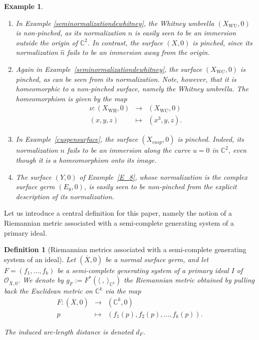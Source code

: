 \documentclass[reqno,dvipsnames,12pt]{amsart}
\newtheorem{defi}[thm]{Definition}
\newtheorem{exam}[thm]{Example}
\begin{document}
\begin{exam}


\begin{enumerate}
    \item In Example \ref{seminormalizationdewhitney}, the Whitney umbrella $(X_{\mathrm{WU}},0)$ is non-pinched, as its normalization $n$ is easily seen to be an immersion outside the origin of $\mathbb{C}^2$. In contrast, the surface $(X,0)$ is pinched, since its normalization $\hat{n}$ fails to be an immersion away from the origin. 
 \item Again in Example~\ref{seminormalizationdewhitney}, the surface $(X_{\mathrm{WC}},0)$ is pinched, as can be seen from its normalization.  Note, however, that it is homeomorphic to a non-pinched surface, namely the Whitney umbrella. The homeomorphism is given by the map
\[
\begin{array}{ccc}
\nu : (X_{\mathrm{WH}},0) & \longrightarrow & (X_{\mathrm{WC}},0) \\
(x,y,z) & \longmapsto & (x^3,y,z).
\end{array}
\]
    
  \item In Example~\ref{cuspensurface}, the surface $(X_{cusp},0)$ is pinched. 
Indeed, its normalization $n$ fails to be an immersion along the curve $u=0$ in $\mathbb{C
}^2$, even though it is a homeomorphism onto its image.
\item The surface $(Y,0)$ of Example~\ref{E_8}, whose normalization is the complex surface germ $(E_8,0)$, is easily seen to be non-pinched from the explicit description of its normalization.

\end{enumerate}
\end{exam}
Let us introduce a central definition for this paper, namely the notion of a Riemannian metric associated with a semi-complete generating system of a primary ideal.

\begin{defi}[Riemannian metrics associated with a semi-complete generating system of an ideal]\label{lesmetriqueideal}
Let $(\overline{X},0)$ be a normal surface germ, and let $F=(f_1,\dots,f_k)$ be a semi-complete generating system of a primary ideal $I$ of $\mathcal{O}_{\overline{X},0}$. We denote by $g_F:=F^*(\langle\ ,\ \rangle_{\mathbb{C}^k})$ the Riemannian metric obtained by pulling back the Euclidean metric on $\mathbb{C}^k$ via the map
\[
\begin{array}{ccc}
F:(\overline{X},0) & \longrightarrow & (\mathbb{C}^k,0) \\
p & \longmapsto & (f_1(p),f_2(p),\dots,f_k(p)).
\end{array}
\]

The induced arc-length distance is denoted  $d_F$.
\end{defi}
\end{document}
